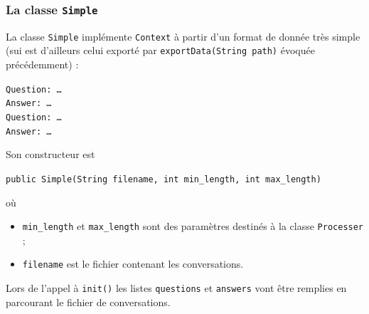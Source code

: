 \documentclass[10pt,a4paper]{article}
\newcommand\tab[1][0.5cm]{\hspace*{#1}}
\begin{document}
\subsubsection{La classe \texttt{Simple}}
La classe \texttt{Simple} implémente \texttt{Context} à partir d'un format de donnée très simple (sui est d'ailleurs celui exporté par \texttt{exportData(String path)} évoquée précédemment) :
\begin{center}
\texttt{Question: \ldots} \\
\texttt{Answer: \ldots} \\
\texttt{Question: \ldots} \\
\texttt{Answer: \ldots} \\
\end{center}
Son constructeur est 
\begin{center}
\texttt{public Simple(String filename, int min\_length, int max\_length)}
\end{center}
où
\begin{itemize}
\item \texttt{min\_length} et \texttt{max\_length} sont des paramètres destinés à la classe \texttt{Processer} ;
\item \texttt{filename} est le fichier contenant les conversations.
\end{itemize}
\tab  Lors de l'appel à \texttt{init()} les listes \texttt{questions} et \texttt{answers} vont être remplies en parcourant le fichier de conversations.
\end{document}
